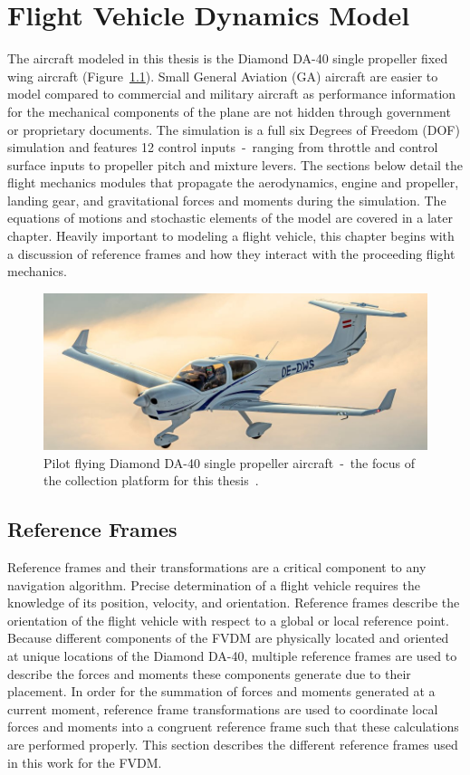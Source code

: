 \chapter{Flight Vehicle Dynamics Model}
The aircraft modeled in this thesis is the Diamond DA-40 single propeller fixed wing aircraft (Figure~\ref{fig:DA40}). Small General Aviation (GA) aircraft are easier to model compared to commercial and military aircraft as performance information for the mechanical components of the plane are not hidden through government or proprietary documents. The simulation is a full six Degrees of Freedom (DOF) simulation and features 12 control inputs~-~ranging from throttle and control surface inputs to propeller pitch and mixture levers. The sections below detail the flight mechanics modules that propagate the aerodynamics, engine and propeller, landing gear, and gravitational forces and moments during the simulation. The equations of motions and stochastic elements of the model are covered in a later chapter. Heavily important to modeling a flight vehicle, this chapter begins with a discussion of reference frames and how they interact with the proceeding flight mechanics.

\begin{figure}[!ht]\label{fig:DA40}
    \centering
    \includegraphics[width=.85\linewidth]{Figures/DA40.jpg}
    \caption{Pilot flying Diamond DA-40 single propeller aircraft~-~the focus of the collection platform for this thesis~\cite{DiamondAircraftDA401969}.}
\end{figure}

\section{\textbf{Reference Frames}}
Reference frames and their transformations are a critical component to any navigation algorithm. Precise determination of a flight vehicle requires the knowledge of its position, velocity, and orientation. Reference frames describe the orientation of the flight vehicle with respect to a global or local reference point. Because different components of the FVDM are physically located and oriented at unique locations of the Diamond DA-40, multiple reference frames are used to describe the forces and moments these components generate due to their placement. In order for the summation of forces and moments generated at a current moment, reference frame transformations are used to coordinate local forces and moments into a congruent reference frame such that these calculations are performed properly. This section describes the different reference frames used in this work for the FVDM\@.
